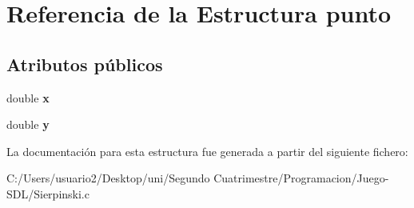 \hypertarget{structpunto}{}\section{Referencia de la Estructura punto}
\label{structpunto}
\subsection*{Atributos públicos}
\begin{DoxyCompactItemize}
\item 
double {\bfseries x}\hypertarget{structpunto_a58de8aa19104882e9f6aa7ea6d9b6916}{}\label{structpunto_a58de8aa19104882e9f6aa7ea6d9b6916}

\item 
double {\bfseries y}\hypertarget{structpunto_a31546c1c87e1567c70cb1a4c95abb311}{}\label{structpunto_a31546c1c87e1567c70cb1a4c95abb311}

\end{DoxyCompactItemize}


La documentación para esta estructura fue generada a partir del siguiente fichero\+:\begin{DoxyCompactItemize}
\item 
C\+:/\+Users/usuario2/\+Desktop/uni/\+Segundo Cuatrimestre/\+Programacion/\+Juego-\/\+S\+D\+L/Sierpinski.\+c\end{DoxyCompactItemize}
